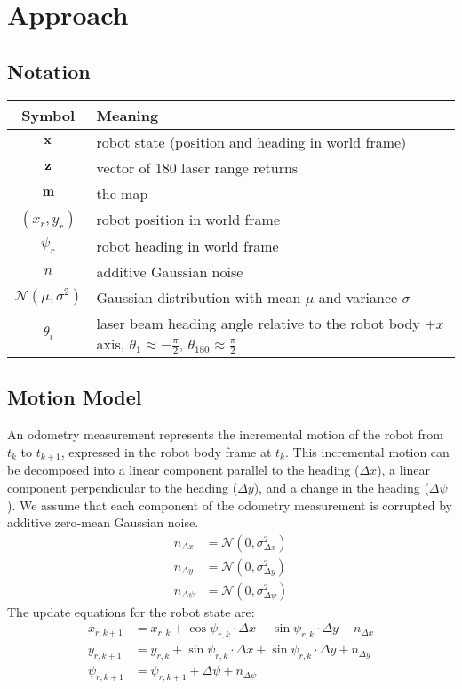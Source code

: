 \section{Approach}

\subsection{Notation}

\begin{tabular}{ c p{13.5cm} }
  \textbf{Symbol} & \textbf{Meaning} \\ \hline
        $\mathbf{x}$ & robot state (position and heading in world frame) \\
        $\mathbf{z}$ & vector of 180 laser range returns \\
        $\mathbf{m}$ & the map \\
     $(x_r, y_r)$ & robot position in world frame \\
     $\psi_r$ & robot heading in world frame \\
           $n$ & additive Gaussian noise \\
 $\mathcal{N}(\mu, \sigma^2)$ & Gaussian distribution with mean $\mu$ and variance $\sigma$ \\
                   $\theta_i$ & laser beam heading angle relative to the robot body +$x$ axis, $\theta_1 \approx -\frac{\pi}{2}$, $\theta_{180} \approx \frac{\pi}{2}$
\end{tabular}

\subsection{Motion Model}
\label{sec:motion_model}
An odometry measurement represents the incremental motion of the robot from $t_k$ to $t_{k+1}$, expressed in the robot body frame at $t_k$.
This incremental motion can be decomposed into a linear component parallel to the heading ($\Delta x$), a linear component perpendicular to the heading ($\Delta y$), and a change in the heading ($\Delta \psi$).
We assume that each component of the odometry measurement is corrupted by additive zero-mean Gaussian noise.
\begin{align}
  n_{\Delta x} &= \mathcal{N}(0, \sigma_{\Delta x}^2 ) \\
  n_{\Delta y} &= \mathcal{N}(0, \sigma_{\Delta y}^2 ) \\
  n_{\Delta \psi} &= \mathcal{N}(0, \sigma_{\Delta \psi}^2 )
\end{align}
The update equations for the robot state are:
\begin{align}
  x_{r,k+1} &= x_{r,k} + \cos \psi_{r,k} \cdot \Delta x - \sin \psi_{r,k} \cdot \Delta y + n_{\Delta x} \\
  y_{r,k+1} &= y_{r,k} + \sin \psi_{r,k} \cdot \Delta x + \sin \psi_{r,k} \cdot \Delta y + n_{\Delta y} \\
  \psi_{r,k+1} &= \psi_{r,k+1} + \Delta \psi + n_{\Delta \psi}
\end{align}

